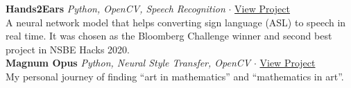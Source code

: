 \documentclass[a4paper]{article}
\begin{document}
{\textbf{Hands2Ears}} {\sl Python, OpenCV, Speech Recognition} $\cdot$ \href{https://devpost.com/software/handstoears}{View Project} \\
A neural network model that helps converting sign language (ASL) to speech in real time. It was chosen as the Bloomberg Challenge winner and second best project in NSBE Hacks 2020.\\
\vspace*{2mm}
{\textbf{Magnum Opus}} {\sl Python, Neural Style Transfer, OpenCV} $\cdot$ \href{https://pandyah5.github.io/magnum_opus/pistachio.html}{View Project} \\
My personal journey of finding “art in mathematics” and “mathematics in art”.\\
\vspace*{2mm}
\end{document}
